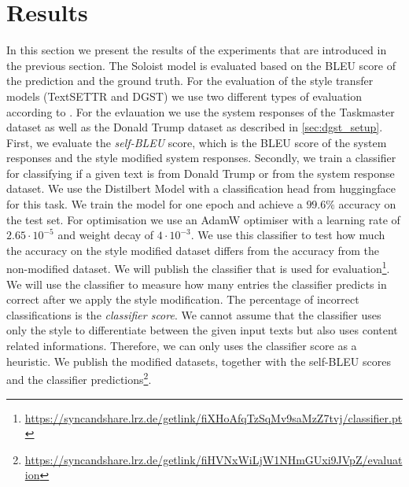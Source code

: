 \documentclass[twocolumn]{tum-article}
\begin{document}
\section{Results}
In this section we present the results of the experiments that are introduced in the previous section. The Soloist model is evaluated based on the BLEU score of the prediction and the ground truth. For the evaluation of the style transfer models (TextSETTR and DGST) we use two different types of evaluation according to \cite{riley2020textsettr}. For the evlauation we use the system responses of the Taskmaster dataset as well as the Donald Trump dataset as described in \autoref{sec:dgst_setup}. First, we evaluate the \textit{self-BLEU} score, which is the BLEU score of the system responses and the style modified system responses. Secondly, we train a classifier for classifying if a given text is from Donald Trump or from the system response dataset. We use the Distilbert Model \cite{sanh2019distilbert} with a classification head from huggingface for this task. We train the model for one epoch and achieve a $99.6\%$ accuracy on the test set. For optimisation we use an AdamW optimiser \cite{loshchilov2017decoupled} with a learning rate of $2.65\cdot 10^{-5}$ and weight decay of $4\cdot 10^{-3}$. We use this classifier to test how much the accuracy on the style modified dataset differs from the accuracy from the non-modified dataset. We will publish the classifier that is used for evaluation\footnote{\url{https://syncandshare.lrz.de/getlink/fiXHoAfqTzSqMv9saMzZ7tvj/classifier.pt}}. We will use the classifier to measure how many entries the classifier predicts in correct after we apply the style modification. The percentage of incorrect classifications is the \textit{classifier score}. We cannot assume that the classifier uses only the style to differentiate between the given input texts but also uses content related informations. Therefore, we can only uses the classifier score as a heuristic. We publish the modified datasets, together with the self-BLEU scores and the classifier predictions\footnote{\url{https://syncandshare.lrz.de/getlink/fiHVNxWiLjW1NHmGUxi9JVpZ/evaluation}}. 
\end{document}

